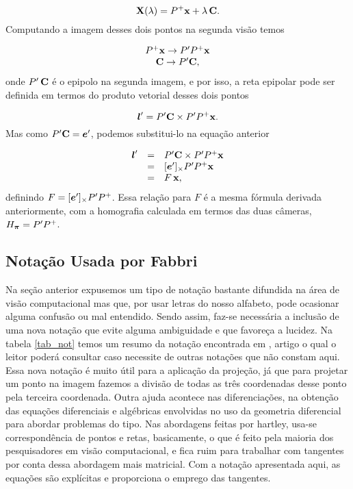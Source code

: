 \begin{equation*}
\mathbf{X}(\lambda)=P^+\mathbf{x}+\lambda\,{\bf C}.
\end{equation*}
Computando a imagem desses dois pontos na segunda visão temos

\begin{equation*}
\begin{array}{c}
P^+\mathbf{x} \rightarrow P'P^+\mathbf{x}\\
{\bf C} \rightarrow P'{\bf C},
\end{array}
\end{equation*}
onde $P'\,{\bf C}$ é o epipolo na segunda imagem, e por isso, a reta epipolar pode ser definida em termos do produto vetorial desses dois pontos

\begin{equation*}
\boldsymbol{l}'=P'{\bf C} \times P'P^+\mathbf{x}.
\end{equation*}
Mas como $P'{\bf C}=\boldsymbol{e}'$, podemos substitui-lo na equação anterior

\begin{equation*}
\begin{array}{rcl}
\boldsymbol{l}'&=&P'{\bf C} \times P'P^+\mathbf{x}\\
&=&[\boldsymbol{e}']_\times P'P^+\mathbf{x}\\
&=&F\,\mathbf{x},
\end{array}
\end{equation*}
definindo $F=[\boldsymbol{e}']_\times P'P^+$. Essa relação para $F$ é a mesma fórmula derivada anteriormente, com a homografia calculada em termos das duas câmeras, $H_{\boldsymbol{\pi}}=P'P^+$.


\subsection{Notação Usada por Fabbri}

Na seção anterior expusemos um tipo de notação bastante difundida na área de visão computacional mas que, por usar letras do nosso alfabeto, pode ocasionar alguma confusão ou mal entendido. Sendo assim, faz-se necessária a inclusão de uma nova notação que evite alguma ambiguidade e que favoreça a lucidez. Na tabela \ref{tab_not} temos um resumo da notação encontrada em \cite{Fabbri:Kimia:IJCV2015}, artigo o qual o leitor poderá consultar caso necessite de outras notações que não constam aqui. Essa nova notação é muito útil para a aplicação da projeção, já que para projetar um ponto na imagem fazemos a divisão de todas as três coordenadas desse ponto pela terceira coordenada. Outra ajuda acontece nas diferenciações, na obtenção das equações diferenciais e algébricas envolvidas no uso da geometria diferencial para abordar problemas do tipo. Nas abordagens feitas por hartley, usa-se correspondência de pontos e retas, basicamente, o que é feito pela maioria dos pesquisadores em visão computacional, e fica ruim para trabalhar com tangentes por conta dessa abordagem mais matricial. Com a notação apresentada aqui, as equações são explícitas e proporciona o emprego das tangentes.

